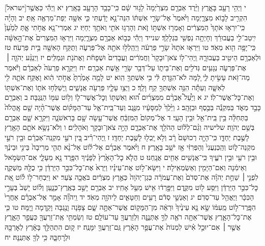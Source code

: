 \documentclass[twoside, openany, parskip=half, 11pt]{book}
\begin{document}
[ישראל]י וַיְהִ֥י רָעָ֖ב בָּאָ֑רֶץ וַיֵּ֨רֶד אַבְרָ֤ם מִצְרַ֙יְמָה֙ לָג֣וּר שָׁ֔ם כִּֽי־כָבֵ֥ד הָרָעָ֖ב בָּאָֽרֶץ׃ יא וַיְהִ֕י כַּאֲשֶׁ֥ר הִקְרִ֖יב לָב֣וֹא מִצְרָ֑יְמָה וַיֹּ֙אמֶר֙ אֶל־שָׂרַ֣י אִשְׁתּ֔וֹ הִנֵּה־נָ֣א יָדַ֔עְתִּי כִּ֛י אִשָּׁ֥ה יְפַת־מַרְאֶ֖ה אָֽתְּ׃ יב וְהָיָ֗ה כִּֽי־יִרְא֤וּ אֹתָךְ֙ הַמִּצְרִ֔ים וְאָמְר֖וּ אִשְׁתּ֣וֹ זֹ֑את וְהָרְג֥וּ אֹתִ֖י וְאֹתָ֥ךְ יְחַיּֽוּ׃ יג אִמְרִי־נָ֖א אֲחֹ֣תִי אָ֑תְּ לְמַ֙עַן֙ יִֽיטַב־לִ֣י בַעֲבוּרֵ֔ךְ וְחָיְתָ֥ה נַפְשִׁ֖י בִּגְלָלֵֽךְ׃ שנייד וַיְהִ֕י כְּב֥וֹא אַבְרָ֖ם מִצְרָ֑יְמָה וַיִּרְא֤וּ הַמִּצְרִים֙ אֶת־הָ֣אִשָּׁ֔ה כִּֽי־יָפָ֥ה הִ֖וא מְאֹֽד׃ טו וַיִּרְא֤וּ אֹתָהּ֙ שָׂרֵ֣י פַרְעֹ֔ה וַיְהַֽלְל֥וּ אֹתָ֖הּ אֶל־פַּרְעֹ֑ה וַתֻּקַּ֥ח הָאִשָּׁ֖ה בֵּ֥ית פַּרְעֹֽה׃ טז וּלְאַבְרָ֥ם הֵיטִ֖יב בַּעֲבוּרָ֑הּ וַֽיְהִי־ל֤וֹ צֹאן־וּבָקָר֙ וַחֲמֹרִ֔ים וַעֲבָדִים֙ וּשְׁפָחֹ֔ת וַאֲתֹנֹ֖ת וּגְמַלִּֽים׃ יז וַיְנַגַּ֨ע יְהֹוָ֧ה ׀ אֶת־פַּרְעֹ֛ה נְגָעִ֥ים גְּדֹלִ֖ים וְאֶת־בֵּית֑וֹ עַל־דְּבַ֥ר שָׂרַ֖י אֵ֥שֶׁת אַבְרָֽם׃ יח וַיִּקְרָ֤א פַרְעֹה֙ לְאַבְרָ֔ם וַיֹּ֕אמֶר מַה־זֹּ֖את עָשִׂ֣יתָ לִּ֑י לָ֚מָּה לֹא־הִגַּ֣דְתָּ לִּ֔י כִּ֥י אִשְׁתְּךָ֖ הִֽוא׃ יט לָמָ֤ה אָמַ֙רְתָּ֙ אֲחֹ֣תִי הִ֔וא וָאֶקַּ֥ח אֹתָ֛הּ לִ֖י לְאִשָּׁ֑ה וְעַתָּ֕ה הִנֵּ֥ה אִשְׁתְּךָ֖ קַ֥ח וָלֵֽךְ׃ כ וַיְצַ֥ו עָלָ֛יו פַּרְעֹ֖ה אֲנָשִׁ֑ים וַֽיְשַׁלְּח֥וּ אֹת֛וֹ וְאֶת־אִשְׁתּ֖וֹ וְאֶת־כׇּל־אֲשֶׁר־לֽוֹ׃ יג א וַיַּ֩עַל֩ אַבְרָ֨ם מִמִּצְרַ֜יִם ה֠וּא וְאִשְׁתּ֧וֹ וְכׇל־אֲשֶׁר־ל֛וֹ וְל֥וֹט עִמּ֖וֹ הַנֶּֽגְבָּה׃ ב וְאַבְרָ֖ם כָּבֵ֣ד מְאֹ֑ד בַּמִּקְנֶ֕ה בַּכֶּ֖סֶף וּבַזָּהָֽב׃ ג וַיֵּ֙לֶךְ֙ לְמַסָּעָ֔יו מִנֶּ֖גֶב וְעַד־בֵּֽית־אֵ֑ל עַד־הַמָּק֗וֹם אֲשֶׁר־הָ֨יָה שָׁ֤ם אׇֽהֳלֹה֙ בַּתְּחִלָּ֔ה בֵּ֥ין בֵּֽית־אֵ֖ל וּבֵ֥ין הָעָֽי׃ ד אֶל־מְקוֹם֙ הַמִּזְבֵּ֔חַ אֲשֶׁר־עָ֥שָׂה שָׁ֖ם בָּרִאשֹׁנָ֑ה וַיִּקְרָ֥א שָׁ֛ם אַבְרָ֖ם בְּשֵׁ֥ם יְהֹוָֽה׃ שלישיה וְגַ֨ם־לְל֔וֹט הַהֹלֵ֖ךְ אֶת־אַבְרָ֑ם הָיָ֥ה צֹאן־וּבָקָ֖ר וְאֹהָלִֽים׃ ו וְלֹא־נָשָׂ֥א אֹתָ֛ם הָאָ֖רֶץ לָשֶׁ֣בֶת יַחְדָּ֑ו כִּֽי־הָיָ֤ה רְכוּשָׁם֙ רָ֔ב וְלֹ֥א יָֽכְל֖וּ לָשֶׁ֥בֶת יַחְדָּֽו׃ ז וַֽיְהִי־רִ֗יב בֵּ֚ין רֹעֵ֣י מִקְנֵֽה־אַבְרָ֔ם וּבֵ֖ין רֹעֵ֣י מִקְנֵה־ל֑וֹט וְהַֽכְּנַעֲנִי֙ וְהַפְּרִזִּ֔י אָ֖ז יֹשֵׁ֥ב בָּאָֽרֶץ׃ ח וַיֹּ֨אמֶר אַבְרָ֜ם אֶל־ל֗וֹט אַל־נָ֨א תְהִ֤י מְרִיבָה֙ בֵּינִ֣י וּבֵינֶ֔ךָ וּבֵ֥ין רֹעַ֖י וּבֵ֣ין רֹעֶ֑יךָ כִּֽי־אֲנָשִׁ֥ים אַחִ֖ים אֲנָֽחְנוּ׃ ט הֲלֹ֤א כׇל־הָאָ֙רֶץ֙ לְפָנֶ֔יךָ הִפָּ֥רֶד נָ֖א מֵעָלָ֑י אִם־הַשְּׂמֹ֣אל וְאֵימִ֔נָה וְאִם־הַיָּמִ֖ין וְאַשְׂמְאִֽילָה׃ י וַיִּשָּׂא־ל֣וֹט אֶת־עֵינָ֗יו וַיַּרְא֙ אֶת־כׇּל־כִּכַּ֣ר הַיַּרְדֵּ֔ן כִּ֥י כֻלָּ֖הּ מַשְׁקֶ֑ה לִפְנֵ֣י ׀ שַׁחֵ֣ת יְהֹוָ֗ה אֶת־סְדֹם֙ וְאֶת־עֲמֹרָ֔ה כְּגַן־יְהֹוָה֙ כְּאֶ֣רֶץ מִצְרַ֔יִם בֹּאֲכָ֖ה צֹֽעַר׃ יא וַיִּבְחַר־ל֣וֹ ל֗וֹט אֵ֚ת כׇּל־כִּכַּ֣ר הַיַּרְדֵּ֔ן וַיִּסַּ֥ע ל֖וֹט מִקֶּ֑דֶם וַיִּפָּ֣רְד֔וּ אִ֖ישׁ מֵעַ֥ל אָחִֽיו׃ יב אַבְרָ֖ם יָשַׁ֣ב בְּאֶֽרֶץ־כְּנָ֑עַן וְל֗וֹט יָשַׁב֙ בְּעָרֵ֣י הַכִּכָּ֔ר וַיֶּאֱהַ֖ל עַד־סְדֹֽם׃ יג וְאַנְשֵׁ֣י סְדֹ֔ם רָעִ֖ים וְחַטָּאִ֑ים לַיהֹוָ֖ה מְאֹֽד׃ יד וַֽיהֹוָ֞ה אָמַ֣ר אֶל־אַבְרָ֗ם אַחֲרֵי֙ הִפָּֽרֶד־ל֣וֹט מֵֽעִמּ֔וֹ שָׂ֣א נָ֤א עֵינֶ֙יךָ֙ וּרְאֵ֔ה מִן־הַמָּק֖וֹם אֲשֶׁר־אַתָּ֣ה שָׁ֑ם צָפֹ֥נָה וָנֶ֖גְבָּה וָקֵ֥דְמָה וָיָֽמָּה׃ טו כִּ֧י אֶת־כׇּל־הָאָ֛רֶץ אֲשֶׁר־אַתָּ֥ה רֹאֶ֖ה לְךָ֣ אֶתְּנֶ֑נָּה וּֽלְזַרְעֲךָ֖ עַד־עוֹלָֽם׃ טז וְשַׂמְתִּ֥י אֶֽת־זַרְעֲךָ֖ כַּעֲפַ֣ר הָאָ֑רֶץ אֲשֶׁ֣ר ׀ אִם־יוּכַ֣ל אִ֗ישׁ לִמְנוֹת֙ אֶת־עֲפַ֣ר הָאָ֔רֶץ גַּֽם־זַרְעֲךָ֖ יִמָּנֶֽה׃ יז ק֚וּם הִתְהַלֵּ֣ךְ בָּאָ֔רֶץ לְאׇרְכָּ֖הּ וּלְרׇחְבָּ֑הּ כִּ֥י לְךָ֖ אֶתְּנֶֽנָּה׃ יח 
\end{document}
